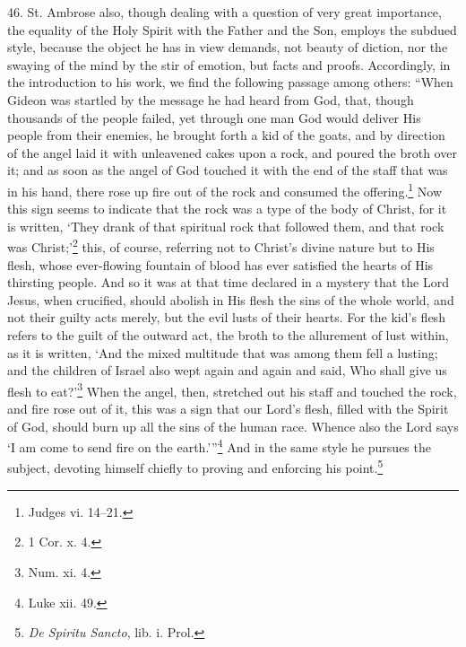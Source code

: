 46. St. Ambrose also, though dealing with a question of very great importance, the equality of the Holy Spirit with the Father and the  Son, employs the subdued style, because the object he has in view demands, not beauty of diction, nor the swaying of the mind by the stir of emotion, but facts and proofs. Accordingly, in the introduction to his work, we find the following passage among others: “When Gideon was startled by the message he had heard from God, that, though thousands of the people failed, yet through one man God would deliver His people from their enemies, he brought forth a kid of the goats, and by direction of the angel laid it with unleavened cakes upon a rock, and poured the broth over it; and as soon as the angel of God touched it with the end of the staff that was in his hand, there rose up fire out of the rock and consumed the offering.\footnote{Judges vi. 14–21.} Now this sign seems to indicate that the rock was a type of the body of Christ, for it is written, ‘They drank of that spiritual rock that followed them, and that rock was Christ;’\footnote{1 Cor. x. 4.} this, of course, referring not to Christ’s divine nature but to His flesh, whose ever-flowing fountain of blood has ever satisfied the hearts of His thirsting people. And so it was at that time declared in a mystery that the Lord Jesus, when crucified, should abolish in His flesh the sins of the whole world, and not their guilty acts merely, but the evil lusts of their hearts. For the kid’s flesh refers to the guilt of the outward act, the broth to the allurement of lust within, as it is written, ‘And the mixed multitude that was among them fell a lusting; and the children of Israel also wept again and again and said, Who shall give us flesh to eat?’\footnote{Num. xi. 4.} When the angel, then, stretched out his staff and touched the rock, and fire rose out of it, this was a sign that our Lord’s flesh, filled with the Spirit of God, should burn up all the sins of the human race. Whence also the Lord says ‘I am come to send fire on the earth.’”\footnote{Luke xii. 49.} And in the same style he pursues the subject, devoting himself chiefly to proving and enforcing his point.\footnote{\emph{De Spiritu Sancto}, lib. i. Prol.}

